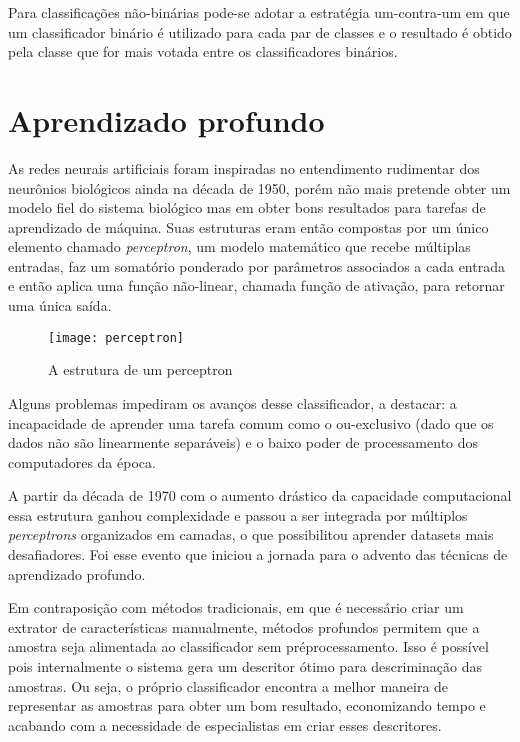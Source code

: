 Para classificações não-binárias pode-se adotar a estratégia um-contra-um em que um classificador binário é utilizado para cada par de classes e o resultado é obtido pela classe que for mais votada entre os classificadores binários.

\section{Aprendizado profundo}
As redes neurais artificiais foram inspiradas no entendimento rudimentar dos neurônios biológicos ainda na década de 1950, porém não mais pretende obter um modelo fiel do sistema biológico mas em obter bons resultados para tarefas de aprendizado de máquina. Suas estruturas eram então compostas por um único elemento chamado \textit{perceptron}, um modelo matemático que recebe múltiplas entradas, faz um somatório ponderado por parâmetros associados a cada entrada e então aplica uma função não-linear, chamada função de ativação, para retornar uma única saída.

\begin{figure}[h]
\caption{A estrutura de um perceptron}
\centering
\texttt{[image: perceptron]}
\label{fig:perceptron}
\end{figure}

Alguns problemas impediram os avanços desse classificador, a destacar: a incapacidade de aprender uma tarefa comum como o ou-exclusivo (dado que os dados não são linearmente separáveis) e o baixo poder de processamento dos computadores da época.

A partir da década de 1970 com o aumento drástico da capacidade computacional essa estrutura ganhou complexidade e passou a ser integrada por múltiplos \textit{perceptrons} organizados em camadas, o que possibilitou aprender datasets mais desafiadores. Foi esse evento que iniciou a jornada para o advento das técnicas de aprendizado profundo.

Em contraposição com métodos tradicionais, em que é necessário criar um extrator de características manualmente, métodos profundos permitem que a amostra seja alimentada ao classificador sem préprocessamento. Isso é possível pois internalmente o sistema gera um descritor ótimo para descriminação das amostras. Ou seja, o próprio classificador encontra a melhor maneira de representar as amostras para obter um bom resultado, economizando tempo e acabando com a necessidade de especialistas em criar esses descritores. %

